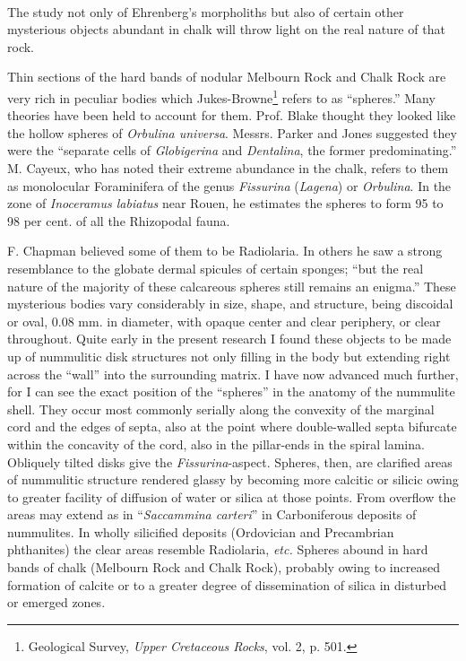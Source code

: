 \documentclass[a4paper, 12pt, oneside]{article}
\begin{document}
\paragraph{}
The study not only of Ehrenberg's morpholiths but also of certain other mysterious objects abundant in chalk will throw light on the real nature of that rock.

Thin sections of the hard bands of nodular Melbourn Rock and Chalk Rock are very rich in peculiar bodies which Jukes-Browne\footnote{Geological Survey, \emph{Upper Cretaceous Rocks}, vol. 2, p. 501.} refers to as ``spheres.'' Many theories have been held to account for them. Prof. Blake thought they looked like the hollow spheres of \emph{Orbulina universa}. Messrs. Parker and Jones suggested they were the ``separate cells of \emph{Globigerina} and \emph{Dentalina}, the former predominating.'' M. Cayeux, who has noted their extreme abundance in the chalk, refers to them as monolocular Foraminifera of the genus \emph{Fissurina} (\emph{Lagena}) or \emph{Orbulina}. In the zone of \emph{Inoceramus labiatus} near Rouen, he estimates the spheres to form 95 to 98 per cent. of all the Rhizopodal fauna.

F. Chapman believed some of them to be Radiolaria. In others he saw a strong resemblance to the globate dermal spicules of certain sponges; ``but the real nature of the majority of these calcareous spheres still remains an enigma.'' These mysterious bodies vary considerably in size, shape, and structure, being discoidal or oval, 0.08 mm. in diameter, with opaque center and clear periphery, or clear throughout. Quite early in the present research I found these objects to be made up of nummulitic disk structures not only filling in the body but extending right across the ``wall'' into the surrounding matrix. I have now advanced much further, for I can see the exact position of the ``spheres'' in the anatomy of the nummulite shell. They occur most commonly serially along the convexity of the marginal cord and the edges of septa, also at the point where double-walled septa bifurcate within the concavity of the cord, also in the pillar-ends in the spiral lamina. Obliquely tilted disks give the \emph{Fissurina}-aspect. Spheres, then, are clarified areas of nummulitic structure rendered glassy by becoming more calcitic or silicic owing to greater facility of diffusion of water or silica at those points. From overflow the areas may extend as in ``\emph{Saccammina carteri}'' in Carboniferous deposits of nummulites. In wholly silicified deposits (Ordovician and Precambrian phthanites) the clear areas resemble Radiolaria, \emph{etc.} Spheres abound in hard bands of chalk (Melbourn Rock and Chalk Rock), probably owing to increased formation of calcite or to a greater degree of dissemination of silica in disturbed or emerged zones.
\end{document}
